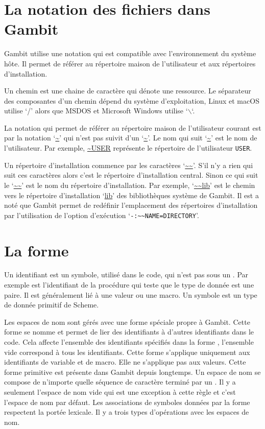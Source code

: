 \section{La notation des fichiers dans Gambit}
Gambit utilise une notation qui est compatible avec l'environnement du
système hôte. Il permet de référer au répertoire maison de l'utilisateur
et aux répertoires d'installation.

Un chemin est une chaine de caractère qui dénote une ressource.
Le séparateur des composantes d'un chemin dépend du système
d'exploitation, Linux et macOS utilise `/' alors que MSDOS et
Microsoft Windows utilise `$\backslash$`.

La notation qui permet de référer au répertoire maison de l'utilisateur
courant est par la notation `\url{~}' qui n'est pas suivit d'un `\url{~}'.
Le nom qui suit `\url{~}' est le nom de l'utilisateur. Par exemple,
\url{~USER} représente le répertoire de l'utilisateur {\tt USER}.

Un répertoire d'installation commence par les caractères `\url{~~}'. S'il n'y
a rien qui suit ces caractères alors c'est le répertoire d'installation central.
Sinon ce qui suit le `\url{~~}' est le nom du répertoire d'installation. Par
exemple, `\url{~~lib}' est le chemin vers le répertoire d'installation `\url{lib}'
des bibliothèques système de Gambit. Il est a noté que Gambit permet de redéfinir
l'emplacement des répertoires d'installation par l'utilisation de l'option d'exécution
`\verb|-:~~NAME=DIRECTORY|'.

\section{La forme }

Un identifiant est un symbole, utilisé dans le code, qui n'est pas sous un
. Par exemple  est l'identifiant de la procédure
qui teste que le type de donnée est une paire. Il est généralement lié à une
valeur ou une macro. Un symbole est un type de donnée primitif de Scheme.

Les espaces de nom sont gérés avec une forme spéciale propre à Gambit. Cette
forme se nomme  et permet de lier des identifiants à
d'autres identifiants dans le code. Cela affecte l'ensemble des identifiants
spécifiés dans la forme , l'ensemble vide correspond à
tous les identifiants. Cette forme s'applique uniquement aux identifiants de
variable et de macro. Elle ne s'applique pas aux valeurs.  Cette forme
primitive est présente dans Gambit depuis longtemps.  Un espace de nom se
compose de n'importe quelle séquence de caractère terminé par un \lstcode{#}.
Il y a seulement l'espace de nom vide qui est une exception à cette règle et
c'est l'espace de nom par défaut.  Les associations de symboles données par la
forme  respectent la portée lexicale. Il y a trois types
d'opérations avec les espaces de nom.

